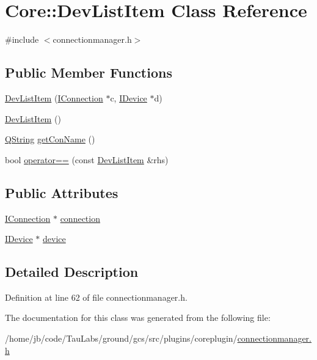 \hypertarget{class_core_1_1_dev_list_item}{\section{\-Core\-:\-:\-Dev\-List\-Item \-Class \-Reference}
\label{class_core_1_1_dev_list_item}
}


{\ttfamily \#include $<$connectionmanager.\-h$>$}

\subsection*{\-Public \-Member \-Functions}
\begin{DoxyCompactItemize}
\item 
\hyperlink{group___core_plugin_ga199678fb9a10fcfef1c6fa7b989d65eb}{\-Dev\-List\-Item} (\hyperlink{class_core_1_1_i_connection}{\-I\-Connection} $\ast$c, \hyperlink{class_core_1_1_i_device}{\-I\-Device} $\ast$d)
\item 
\hyperlink{group___core_plugin_ga2fcb8c98fc900f791ff84bd456d87ff0}{\-Dev\-List\-Item} ()
\item 
\hyperlink{group___u_a_v_objects_plugin_gab9d252f49c333c94a72f97ce3105a32d}{\-Q\-String} \hyperlink{group___core_plugin_gaf7dec4fe2f034b9aa427ebd65a654223}{get\-Con\-Name} ()
\item 
bool \hyperlink{group___core_plugin_ga4f9413618925cdef3d54aa67f2bf460b}{operator==} (const \hyperlink{class_core_1_1_dev_list_item}{\-Dev\-List\-Item} \&rhs)
\end{DoxyCompactItemize}
\subsection*{\-Public \-Attributes}
\begin{DoxyCompactItemize}
\item 
\hyperlink{class_core_1_1_i_connection}{\-I\-Connection} $\ast$ \hyperlink{group___core_plugin_ga90db60736480bb690e6ec029acbce4d1}{connection}
\item 
\hyperlink{class_core_1_1_i_device}{\-I\-Device} $\ast$ \hyperlink{group___core_plugin_gaeccb7d8e859208ce0b37c4589b3b4c88}{device}
\end{DoxyCompactItemize}


\subsection{\-Detailed \-Description}


\-Definition at line 62 of file connectionmanager.\-h.



\-The documentation for this class was generated from the following file\-:\begin{DoxyCompactItemize}
\item 
/home/jb/code/\-Tau\-Labs/ground/gcs/src/plugins/coreplugin/\hyperlink{connectionmanager_8h}{connectionmanager.\-h}\end{DoxyCompactItemize}

